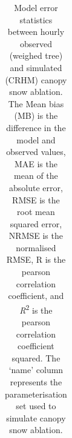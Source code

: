 \documentclass[
  letterpaper,
  DIV=11,
  numbers=noendperiod]{scrartcl}
\begin{document}
\begin{longtable}[]{@{}
  >{\raggedright\arraybackslash}p{}
  >{\raggedright\arraybackslash}p{}
  >{\raggedleft\arraybackslash}p{}
  >{\raggedleft\arraybackslash}p{}
  >{\raggedleft\arraybackslash}p{}
  >{\raggedleft\arraybackslash}p{}@{}}

\caption{\label{tbl-obs-mod-stats-avg}Model error statistics between
hourly observed (weighed tree) and simulated (CRHM) canopy snow
ablation. The Mean bias (MB) is the difference in the model and observed
values, MAE is the mean of the absolute error, RMSE is the root mean
squared error, NRMSE is the normalised RMSE, R is the pearson
correlation coefficient, and \emph{R}\textsuperscript{2} is the pearson
correlation coefficient squared. The `name' column represents the
parameterisation set used to simulate canopy snow ablation.}

\tabularnewline


\end{longtable}
\end{document}
